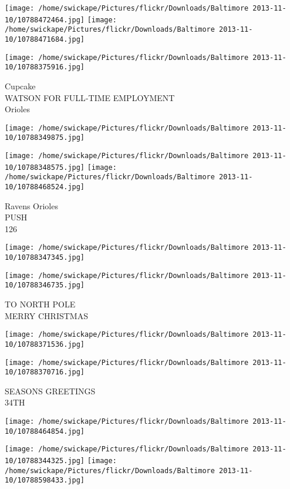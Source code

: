 \documentclass[10pt,letterpaper]{article}
\begin{document}
\texttt{[image: /home/swickape/Pictures/flickr/Downloads/Baltimore 2013-11-10/10788472464.jpg]}
\texttt{[image: /home/swickape/Pictures/flickr/Downloads/Baltimore 2013-11-10/10788471684.jpg]}

\texttt{[image: /home/swickape/Pictures/flickr/Downloads/Baltimore 2013-11-10/10788375916.jpg]}

Cupcake\\
WATSON FOR FULL{-}TIME EMPLOYMENT\\
Orioles
\pagebreak

\texttt{[image: /home/swickape/Pictures/flickr/Downloads/Baltimore 2013-11-10/10788349875.jpg]}

\vspace{0.25in}
\texttt{[image: /home/swickape/Pictures/flickr/Downloads/Baltimore 2013-11-10/10788348575.jpg]}
\texttt{[image: /home/swickape/Pictures/flickr/Downloads/Baltimore 2013-11-10/10788468524.jpg]}

Ravens Orioles\\
PUSH\\
126
\pagebreak

\texttt{[image: /home/swickape/Pictures/flickr/Downloads/Baltimore 2013-11-10/10788347345.jpg]}

\vspace{0.25in}
\texttt{[image: /home/swickape/Pictures/flickr/Downloads/Baltimore 2013-11-10/10788346735.jpg]}

TO NORTH POLE\\
MERRY CHRISTMAS
\pagebreak

\texttt{[image: /home/swickape/Pictures/flickr/Downloads/Baltimore 2013-11-10/10788371536.jpg]}

\vspace{0.25in}
\texttt{[image: /home/swickape/Pictures/flickr/Downloads/Baltimore 2013-11-10/10788370716.jpg]}

SEASONS GREETINGS\\
34TH
\pagebreak

\texttt{[image: /home/swickape/Pictures/flickr/Downloads/Baltimore 2013-11-10/10788464854.jpg]}

\vspace{0.25in}
\texttt{[image: /home/swickape/Pictures/flickr/Downloads/Baltimore 2013-11-10/10788344325.jpg]}
\texttt{[image: /home/swickape/Pictures/flickr/Downloads/Baltimore 2013-11-10/10788598433.jpg]}
\end{document}
